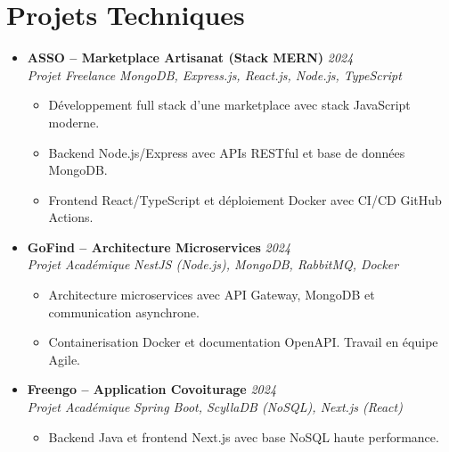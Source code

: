 \documentclass[a4paper,11pt]{article}
\begin{document}
\section{Projets Techniques}
\begin{itemize}[leftmargin=*, label={-}]

\item \textbf{ASSO -- Marketplace Artisanat (Stack MERN)} \hfill \textit{2024} \\
\textit{Projet Freelance} \hfill \textit{MongoDB, Express.js, React.js, Node.js, TypeScript}
\vspace{-2pt}
    \begin{itemize}[leftmargin=0.4cm, nosep, label=\tiny$\bullet$]
        \item \small{Développement full stack d'une marketplace avec stack JavaScript moderne.}
        \item \small{Backend Node.js/Express avec APIs RESTful et base de données MongoDB.}
        \item \small{Frontend React/TypeScript et déploiement Docker avec CI/CD GitHub Actions.}
    \end{itemize}
\vspace{3pt}

\item \textbf{GoFind -- Architecture Microservices} \hfill \textit{2024} \\
\textit{Projet Académique} \hfill \textit{NestJS (Node.js), MongoDB, RabbitMQ, Docker}
\vspace{-2pt}
    \begin{itemize}[leftmargin=0.4cm, nosep, label=\tiny$\bullet$]
        \item \small{Architecture microservices avec API Gateway, MongoDB et communication asynchrone.}
        \item \small{Containerisation Docker et documentation OpenAPI. Travail en équipe Agile.}
    \end{itemize}
\vspace{3pt}

\item \textbf{Freengo -- Application Covoiturage} \hfill \textit{2024} \\
\textit{Projet Académique} \hfill \textit{Spring Boot, ScyllaDB (NoSQL), Next.js (React)}
\vspace{-2pt}
    \begin{itemize}[leftmargin=0.4cm, nosep, label=\tiny$\bullet$]
        \item \small{Backend Java et frontend Next.js avec base NoSQL haute performance.}
    \end{itemize}
\vspace{3pt}


\end{itemize}
\end{document}
